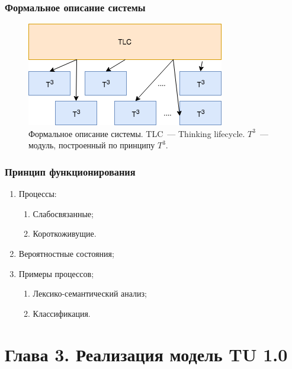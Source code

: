 \documentclass[14pt]{beamer}
\begin{document}
\begin{frame}
\frametitle{Формальное описание системы}
\begin{figure} [h] 
  \center
  \includegraphics [scale=0.6] {SystemOverview.png}
  \caption{Формальное описание системы. TLC~--- Thinking lifecycle. $T^3$~--- модуль, построенный по принципу $T^3$.} 
  \label{img:SystemOverview.png} 
\end{figure}

\end{frame}


\begin{frame}
\frametitle{Принцип функционирования}
\begin{enumerate}
	\item Процессы:
\begin{enumerate}
	\item Слабосвязанные;
	\item Короткоживущие.
\end{enumerate}
\item Вероятностные состояния;
\item Примеры процессов;
\begin{enumerate}
	\item Лексико-семантический анализ;
	\item Классификация.
\end{enumerate}
\end{enumerate}
\end{frame}





%
%
\section[Глава 3]{Глава 3. Реализация модель TU 1.0}
\end{document}
